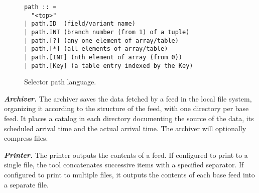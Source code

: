 


    
\begin{figure}
{\small
\begin{verbatim}
path :: =  
  "<top>"
| path.ID  (field/variant name)
| path.INT (branch number (from 1) of a tuple)
| path.[?] (any one element of array/table) 
| path.[*] (all elements of array/table) 
| path.[INT] (nth element of array (from 0))
| path.[Key] (a table entry indexed by the Key)
\end{verbatim}
}
\caption{Selector path language.}
\label{fig:selector-lang}
\end{figure}


\textbf{\textit{Archiver.}} The archiver saves the data fetched by a feed 
in the local file system, organizing it according to the structure
of the feed, with one directory per base feed.  
It places a catalog in each directory documenting the source of 
the data, its scheduled arrival time and the
actual arrival time. The archiver will optionally compress
files.

\textbf{\textit{Printer.}} The printer outputs the contents of a
feed.  If configured to print to a single file, the tool concatenates
successive items with a specified separator. If configured to print to
multiple files, it outputs the contents of each base feed into a
separate file. 


